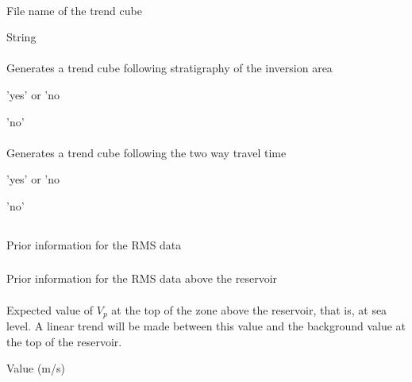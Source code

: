 {\paragraph{}
 \slist
   \item \Description File name of the trend cube
   \item \Argument String
   \item \Default
 \elist

\paragraph{}
 \slist
   \item \Description Generates a trend cube following stratigraphy of the inversion area
   \item \Argument 'yes' or 'no
   \item \Default 'no'
 \elist

\paragraph{}
 \slist
   \item \Description Generates a trend cube following the two way travel time
   \item \Argument 'yes' or 'no
   \item \Default 'no'
 \elist

\subsection{}
 \slist
   \item \Description Prior information for the RMS data
   \item \Argument
   \item \Default
 \elist

\subsubsection{}
 \slist
   \item \Description Prior information for the RMS data above the reservoir
   \item \Argument
   \item \Default
 \elist

\paragraph{}
 \slist
   \item \Description Expected value of $V_p$ at the top of the zone above the reservoir, that is, at sea level. A linear trend will be made between this value and the background value at the top of the reservoir.
   \item \Argument Value (m/s)
   \item \Default
 \elist

}
